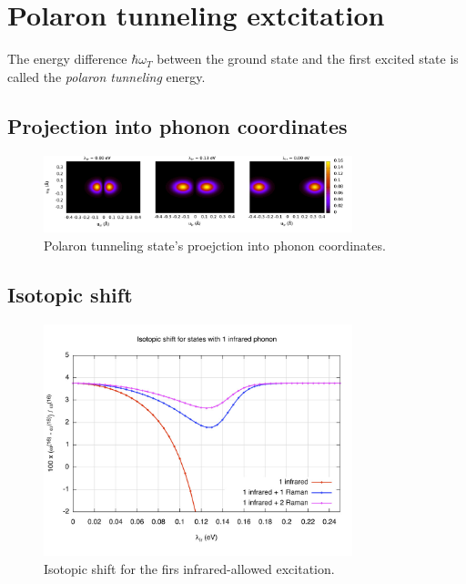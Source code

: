 \chapter{Polaron tunneling extcitation}
\label{chap:polaron}

The energy difference $\hbar \omega_T$ between the ground state and the first excited state is called the \textit{polaron tunneling} energy.

\section{Projection into phonon coordinates}

\begin{figure}[ht!]
\centering
\includegraphics[width=0.8\textwidth]{images/ph-first_infrared.png}
\caption{Polaron tunneling state's proejction into phonon coordinates.}
\label{fig:ph-first_infrared}
\end{figure}

\section{Isotopic shift}
\label{sec:polaron-isotopic-shift}

\begin{figure}[ht!]
\centering
\includegraphics[width=0.8\textwidth]{images/isot-1ir.jpg}
\caption{Isotopic shift for the firs infrared-allowed excitation.}
\label{fig:isot-1ir}
\end{figure}

